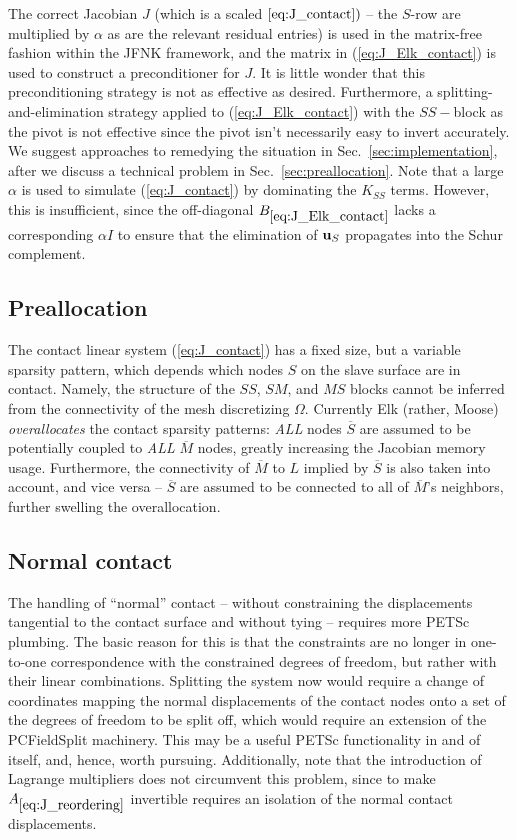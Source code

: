 \documentclass[11pt]{article}
\newcommand{\vecu}{{\bf u}}
\begin{document}
The correct Jacobian $J$ (which is a scaled $\ref{eq:J_contact})$ -- the $S$-row are multiplied by $\alpha$ as are the relevant residual entries) is used in the matrix-free fashion
within the JFNK framework, and the matrix in (\ref{eq:J_Elk_contact}) is used to construct a preconditioner for $J$.
It is little wonder that this preconditioning strategy is not as effective as desired.
Furthermore, a splitting-and-elimination strategy applied to (\ref{eq:J_Elk_contact}) with the $SS-$block as the pivot is not effective since the pivot isn't necessarily easy to invert accurately.
We suggest approaches to remedying the situation in Sec.~\ref{sec:implementation}, after we discuss a technical problem in Sec.~\ref{sec:preallocation}.
Note that a large $\alpha$ is used to simulate (\ref{eq:J_contact}) by dominating the $K_{SS}$ terms.  However, this is insufficient, since the off-diagonal $B_{\ref{eq:J_Elk_contact}}$ lacks a corresponding $\alpha I$ to ensure that the elimination of $\vecu_S$ propagates into the Schur complement.

\subsection{Preallocation\label{sec:preallocation}}
The contact linear system (\ref{eq:J_contact}) has a fixed size, but a variable sparsity pattern, which depends which nodes $S$ on the slave surface are in contact.
Namely, the structure of the $SS$, $SM$, and $MS$ blocks cannot be inferred from the connectivity of the mesh discretizing $\Omega$.  Currently Elk (rather, Moose) \emph{overallocates}
the contact sparsity patterns: \emph{ALL} nodes $\overline S$ are assumed to be potentially coupled to \emph{ALL} $\overline M$ nodes, greatly increasing the Jacobian memory usage.
Furthermore, the connectivity of $\overline M$ to $L$ implied by $\overline S$ is also taken into account, and vice versa -- $\overline S$ are assumed to be connected to all of $\overline M$'s neighbors,
further swelling the overallocation.

\subsection{Normal contact}
The handling of ``normal'' contact -- without constraining the displacements tangential to the contact surface and without tying -- requires more PETSc plumbing.
The basic reason for this is that the constraints are no longer in one-to-one correspondence with the constrained degrees of freedom, but rather with their linear combinations.
Splitting the system now would require a change of coordinates mapping the normal displacements of the contact nodes onto a set of the degrees of freedom to be split off,
which would require an extension of the PCFieldSplit machinery.  This may be a useful PETSc functionality in and of itself, and, hence, worth pursuing.
Additionally, note that the introduction of Lagrange multipliers does not circumvent this problem, since to make $A_{\ref{eq:J_reordering}}$ invertible requires an isolation of the normal contact displacements.
\end{document}
